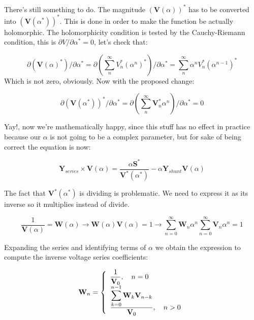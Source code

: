 \documentclass[11pt,fleqn]{book} %
\begin{document}
There's still something to do. The magnitude $\left(\textbf{V}( \alpha )\right)^*$ has to be converted into $\left(\textbf{V}( \alpha^* )\right)^*$. This is done in order to make the function be actually holomorphic. The holomorphicity condition is tested by the Cauchy-Riemann condition, this is $\partial V / \partial \alpha^* = 0$, let's check that:



\begin{equation}
\partial \left(\textbf{V}( \alpha )^*\right) / \partial \alpha^*  = \partial \left(\sum_{n}^{\infty} V_n^* (\alpha ^n)^*\right) / \partial \alpha^*  = \sum_{n}^{\infty} \alpha ^n V_n^* (\alpha ^{n-1})^*
\end{equation} 
Which is not zero, obviously. Now with the proposed change:

\begin{equation}
\partial \left( \textbf{V}( \alpha^* )\right)^* / \partial \alpha^*  = \partial \left(\sum_{n}^{\infty} \textbf{V}_n^* \alpha ^n \right) / \partial \alpha^*  = 0
\end{equation} 

Yay!, now we're mathematically happy, since this stuff has no effect in practice because our $\alpha$ is not going to be a complex parameter, but for sake of being correct the equation is now:

\begin{equation}
{\textbf{Y}_{series}\times \textbf{V}( \alpha )} = \frac{ \alpha\textbf{S}^*}{\textbf{V}^*( \alpha^* )} - \alpha \textbf{Y}_{shunt} \textbf{V}( \alpha )
\label{base_eq_embedded2}
\end{equation}

The fact that $\textbf{V}^*( \alpha^* )$ is dividing is problematic. We need to express it as its inverse so it multiplies instead of divide.

\begin{equation} 
\frac{1}{\textbf{V}( \alpha)} = \textbf{W}( \alpha ) \longrightarrow \textbf{W}( \alpha ) \textbf{V}( \alpha) = 1 \longrightarrow \sum_{n=0}^{\infty}{\textbf{W}_n \alpha^n}  \sum_{n=0}^{\infty}{\textbf{V}_n \alpha^n} = 1
\end{equation}

Expanding the series and identifying terms of $\alpha$ we obtain the expression to compute the inverse voltage series coefficients:

\begin{equation}
\textbf{W}_n =
\left\{
	\begin{array}{ll}
		\mathlarger{\frac{1}{\textbf{V}_0}}, \quad n=0\\
		\mathlarger{\frac{\mathlarger{\sum_{k=0}^{n-1}\textbf{W}_k \textbf{V}_{n-k}}}{\textbf{V}_0}}, \quad n>0
	\end{array}
\right.
\end{equation}
\end{document}
